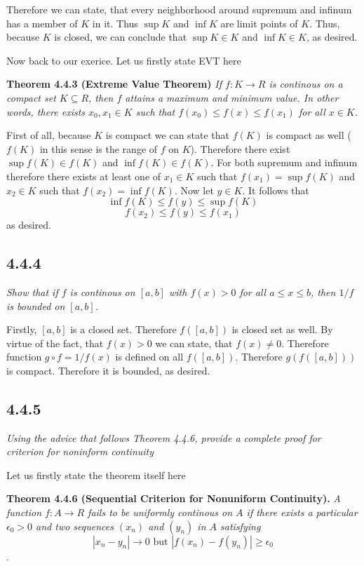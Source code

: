 \documentclass[11pt,oneside,titlepage]{book}
\begin{document}
Therefore we can state, that every neighborhood around supremum and infinum
has a member of $K$ in it. Thus $\sup K$ and $\inf  K$ are limit points of $K$.
Thus, because $K$ is closed, we can conclude that $\sup K \in K$ and
$\inf K \in K$, as desired.

Now back to our exerice. Let us firstly state EVT here

\textbf{Theorem 4.4.3 (Extreme Value Theorem)}
\textit{If $f: K \to R$ is continous on a compact set $K \subseteq R$, then
  $f$ attains a maximum and minimum value. In other words, there exists
  $x_0, x_1 \in K$ such that $f(x_0) \leq f(x) \leq f(x_1)$ for all $x \in K$.}

First of all, because $K$ is compact we can state that $f(K)$ is compact
as well ($f(K)$ in this sense is the range of $f$ on $K$). Therefore
there exist $\sup f(K) \in f(K)$ and  $\inf f(K) \in f(K)$.
For both supremum and infinum therefore there exists at least one of
$x_1 \in K$ such that $f(x_1) = \sup f(K)$ and $x_2 \in K$
such that $f(x_2) = \inf f(K)$. Now let $y \in K$. It follows that
$$\inf f(K) \leq f(y) \leq \sup f(K) $$
$$f(x_2) \leq f(y) \leq f(x_1) $$
as desired.

\subsection*{4.4.4}
\textit{Show that if $f$ is continous on $[a, b]$ with $f(x) > 0$ for all
  $a \leq x \leq b$, then $1/f$ is bounded on $[a, b]$.}

Firstly, $[a, b]$ is a closed set. Therefore $f([a, b])$ is closed set as well.
By virtue of the fact, that $f(x) > 0$ we can state, that $f(x) \neq 0$.
Therefore function $g \circ f = 1/f(x)$ is defined on all $f([a, b])$.
Therefore $g(f([a, b]))$ is compact. Therefore it is bounded, as desired.

\subsection*{4.4.5}
\textit{Using the advice that follows Theorem 4.4.6, provide a complete
  proof for criterion for noninform continuity}

Let us firstly state the theorem itself here

\textbf{Theorem 4.4.6 (Sequential Criterion for Nonuniform Continuity).}
\textit{A function $f: A \to R$ fails to be uniformly continous on $A$ if
  there exists a particular $\epsilon_0 > 0$ and two sequences $(x_n)$ and
  $(y_n)$ in $A$ satisfying}
$$|x_n - y_n| \to 0 \text{ but } |f(x_n) - f(y_n)| \geq \epsilon_0$$.
\end{document}
